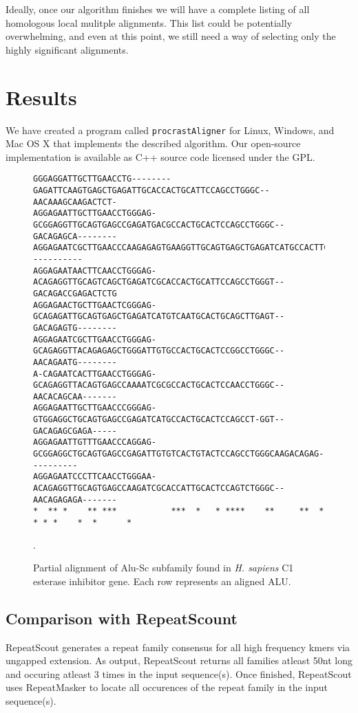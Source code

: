 \documentclass{llncs}
\begin{document}
Ideally, once our algorithm finishes we will have a complete listing of all homologous local mulitple alignments. This list could be potentially overwhelming, and even at this point, we still need a way of selecting only the highly significant alignments. 


\section{Results}
We have created a program called \texttt{procrastAligner} for Linux,
Windows, and Mac OS X that implements the described algorithm. Our
open-source implementation is available as C++ source code licensed
under the GPL.

\begin{figure}[t]
\scriptsize
\begin{verbatim}
GGGAGGATTGCTTGAACCTG--------GAGATTCAAGTGAGCTGAGATTGCACCACTGCATTCCAGCCTGGGC--AACAAAGCAAGACTCT-
AGGAGAATTGCTTGAACCTGGGAG-GCGGAGGTTGCAGTGAGCCGAGATGACGCCACTGCACTCCAGCCTGGGC--GACAGAGCA--------
AGGAGAATCGCTTGAACCCAAGAGAGTGAAGGTTGCAGTGAGCTGAGATCATGCCACTTCACTCCAGCCTGAGTGAAACAGC-----------
AGGAGAATAACTTCAACCTGGGAG-ACAGAGGTTGCAGTCAGCTGAGATCGCACCACTGCATTCCAGCCTGGGT--GACAGACCGAGACTCTG
AGGAGAACTGCTTGAACTCGGGAG-GCAGAGATTGCAGTGAGCTGAGATCATGTCAATGCACTGCAGCTTGAGT--GACAGAGTG--------
AGGAGAATCGCTTGAACCTGGGAG-GCAGAGGTTACAGAGAGCTGGGATTGTGCCACTGCACTCCGGCCTGGGC--AACAGAATG--------
A-CAGAATCACTTGAACCTGGGAG-GCAGAGGTTACAGTGAGCCAAAATCGCGCCACTGCACTCCAACCTGGGC--AACACAGCAA-------
AGGAGAATTGCTTGAACCCGGGAG-GTGGAGGCTGCAGTGAGCCGAGATCATGCCACTGCACTCCAGCCT-GGT--GACAGAGCGAGA-----
AGGAGAATTGTTTGAACCCAGGAG-GCGGAGGCTGCAGTGAGCCGAGATTGTGTCACTGTACTCCAGCCTGGGCAAGACAGAG----------
AGGAGAATCCCTTCAACCTGGGAA-ACAGAGGTTGCAGTGAGCCAAGATCGCACCATTGCACTCCAGTCTGGGC--AACAGAGAGA-------
*  ** *    ** ***           ***  *   * ****    **     **  * * * *    *  *      *

\end{verbatim}
\vspace{-0.5cm}
\normalsize
\caption{Partial alignment of Alu-Sc subfamily found in \emph{H. sapiens} C1 esterase inhibitor gene. Each row represents an aligned ALU.}.
\end{figure}

\subsection{Comparison with RepeatScount}

RepeatScout generates a repeat family consensus for all high frequency kmers via ungapped extension. As output, RepeatScout returns all families atleast 50nt long and occuring atleast 3 times in the input sequence(s). Once finished, RepeatScout uses RepeatMasker to locate all occurences of the repeat family in the input sequence(s).
\end{document}
